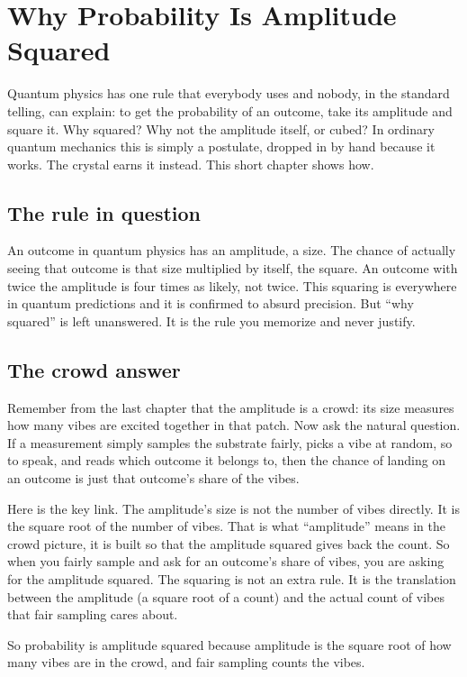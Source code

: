 \section{Why Probability Is Amplitude Squared}

Quantum physics has one rule that everybody uses and nobody, in the standard telling, can explain: to get the probability of an outcome, take its amplitude and square it. Why squared? Why not the amplitude itself, or cubed? In ordinary quantum mechanics this is simply a postulate, dropped in by hand because it works. The crystal earns it instead. This short chapter shows how.

\subsection{The rule in question}

An outcome in quantum physics has an amplitude, a size. The chance of actually seeing that outcome is that size multiplied by itself, the square. An outcome with twice the amplitude is four times as likely, not twice. This squaring is everywhere in quantum predictions and it is confirmed to absurd precision. But ``why squared'' is left unanswered. It is the rule you memorize and never justify.

\subsection{The crowd answer}

Remember from the last chapter that the amplitude is a crowd: its size measures how many vibes are excited together in that patch. Now ask the natural question. If a measurement simply samples the substrate fairly, picks a vibe at random, so to speak, and reads which outcome it belongs to, then the chance of landing on an outcome is just that outcome's share of the vibes.

Here is the key link. The amplitude's size is not the number of vibes directly. It is the square root of the number of vibes. That is what ``amplitude'' means in the crowd picture, it is built so that the amplitude squared gives back the count. So when you fairly sample and ask for an outcome's share of vibes, you are asking for the amplitude squared. The squaring is not an extra rule. It is the translation between the amplitude (a square root of a count) and the actual count of vibes that fair sampling cares about.

So probability is amplitude squared because amplitude is the square root of how many vibes are in the crowd, and fair sampling counts the vibes.

